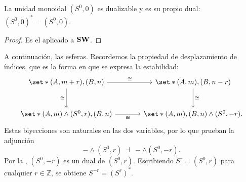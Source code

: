 \begin{prop}\label{prop:s0-dual}
La unidad monoidal $(S^0,0)$ es dualizable y es su propio dual: $(S^0,0)^*=(S^0,0)$.
\end{prop}
\begin{proof}
Es el  aplicado a $\mathbf{SW}$.
\end{proof}

A continuación, las esferas. Recordemos la propiedad de desplazamiento de índices, que es la forma en que se expresa la estabilidad:
\[
\begin{tikzcd}[column sep=large,row sep=large]
\set*{(A,m+r),(B,n)} \arrow[r,"{\cong}"] \arrow[d,"{\cong}"']
 &\set*{(A,m),(B,n-r)} \arrow[d,"{\cong}"]\\
\set*{(A,m)\wedge(S^0,r),(B,n)}
 \arrow[r,"{\cong}"']
 &\set*{(A,m),(B,n)\wedge (S^0,-r)} .
\end{tikzcd}
\]
Estas biyecciones son naturales en las dos variables, por lo que prueban la adjunción
\[
-\wedge(S^0,r)\ \dashv\ -\wedge(S^0,-r).
\]
Por la , $(S^0,-r)$ es un dual de $(S^0,r)$. Escribiendo $S^r=(S^0,r)$ para cualquier $r\in\mathbb Z$, se obtiene $S^{-r}=(S^r)^*$.


